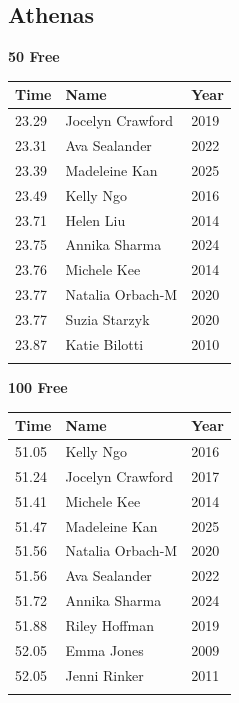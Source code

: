 
\clearpage
{}
\clearpage
\subsection{Athenas}
\vspace{1.2em}
\noindent\begin{minipage}[t]{0.48\textwidth}
\centering
\textbf{\textcolor{teamprimary}{50 Free}}\par
\vspace{0.5em}
\centering
\small
\renewcommand{\arraystretch}{1.0}
\setlength{\tabcolsep}{4pt}
\begin{tabular}{@{}p{1.8cm}p{3.0cm}p{1.0cm}@{}}
\toprule
\textbf{Time} & \textbf{Name} & \textbf{Year} \\
\midrule
23.29 & Jocelyn Crawford & 2019 \\
23.31 & Ava Sealander & 2022 \\
23.39 & Madeleine Kan & 2025 \\
23.49 & Kelly Ngo & 2016 \\
23.71 & Helen Liu & 2014 \\
23.75 & Annika Sharma & 2024 \\
23.76 & Michele Kee & 2014 \\
23.77 & Natalia Orbach-M & 2020 \\
23.77 & Suzia Starzyk & 2020 \\
23.87 & Katie Bilotti & 2010 \\
\bottomrule
\vspace{0.5em}
\end{tabular}
\end{minipage}
\hfill
\begin{minipage}[t]{0.48\textwidth}
\centering
\textbf{\textcolor{teamprimary}{100 Free}}\par
\vspace{0.5em}
\centering
\small
\renewcommand{\arraystretch}{1.0}
\setlength{\tabcolsep}{4pt}
\begin{tabular}{@{}p{1.8cm}p{3.0cm}p{1.0cm}@{}}
\toprule
\textbf{Time} & \textbf{Name} & \textbf{Year} \\
\midrule
51.05 & Kelly Ngo & 2016 \\
51.24 & Jocelyn Crawford & 2017 \\
51.41 & Michele Kee & 2014 \\
51.47 & Madeleine Kan & 2025 \\
51.56 & Natalia Orbach-M & 2020 \\
51.56 & Ava Sealander & 2022 \\
51.72 & Annika Sharma & 2024 \\
51.88 & Riley Hoffman & 2019 \\
52.05 & Emma Jones & 2009 \\
52.05 & Jenni Rinker & 2011 \\
\bottomrule
\vspace{0.5em}
\end{tabular}
\end{minipage}
